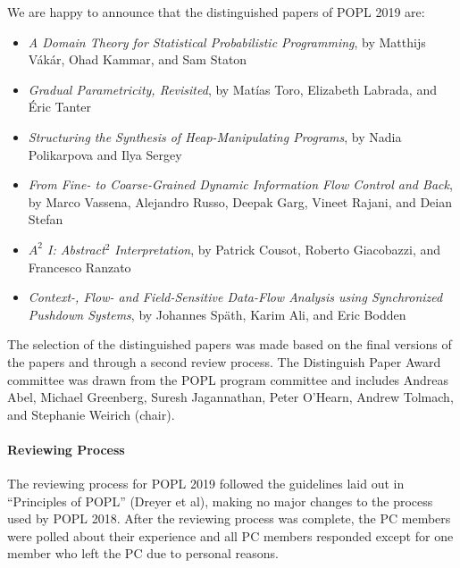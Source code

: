 We are happy to announce that the distinguished papers of POPL 2019 are:

\begin{itemize}
\item {\em A Domain Theory for Statistical Probabilistic Programming}, by 
Matthijs Vákár, Ohad Kammar, and Sam Staton
\item {\em Gradual Parametricity, Revisited}, by
Matías Toro, Elizabeth Labrada, and Éric Tanter
\item {\em Structuring the Synthesis of Heap-Manipulating Programs}, by 
Nadia Polikarpova and Ilya Sergey
\item {\em From Fine- to Coarse-Grained Dynamic Information Flow Control and
    Back}, by
Marco Vassena, Alejandro Russo, Deepak Garg, Vineet Rajani, and Deian Stefan
\item {\em $A^2$ I: Abstract$^2$ Interpretation}, by 
Patrick Cousot, Roberto Giacobazzi, and Francesco Ranzato
\item {\em Context-, Flow- and Field-Sensitive Data-Flow Analysis using
  Synchronized Pushdown Systems}, by
Johannes Späth, Karim Ali, and Eric Bodden
\end{itemize}

The selection of the distinguished papers was made based on the final versions
of the papers and through a second review process. The Distinguish Paper Award
committee was drawn from the POPL program committee and includes Andreas Abel,
Michael Greenberg, Suresh Jagannathan, Peter O'Hearn, Andrew Tolmach, and
Stephanie Weirich (chair).

\paragraph{Reviewing Process}
%
The reviewing process for POPL 2019 followed the guidelines laid out in
``Principles of POPL'' (Dreyer et al), making no major changes to the process
used by POPL 2018. After the reviewing process was complete, the PC members
were polled about their experience and all PC members responded except for one
member who left the PC due to personal reasons.

